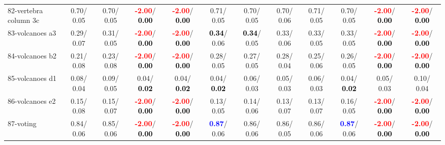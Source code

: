 \begin{table}[h]
\begin{center}
{\begin{tabular}{lc|c|c|c|c|c|c|c|c|c|c}
82-vertebra column 3c &   0.70/  0.05 &   0.70/  0.05 & \textcolor{red}{\textbf{ -2.00}}/\textcolor{black}{\textbf{  0.00}} & \textcolor{red}{\textbf{ -2.00}}/\textcolor{black}{\textbf{  0.00}} &   0.71/  0.05 &   0.70/  0.05 &   0.70/  0.06 &   0.71/  0.05 &   0.70/  0.05 & \textcolor{red}{\textbf{ -2.00}}/\textcolor{black}{\textbf{  0.00}} & \textcolor{red}{\textbf{ -2.00}}/\textcolor{black}{\textbf{  0.00}} \\
83-volcanoes a3 &   0.29/  0.07 &   0.31/  0.05 & \textcolor{red}{\textbf{ -2.00}}/\textcolor{black}{\textbf{  0.00}} & \textcolor{red}{\textbf{ -2.00}}/\textcolor{black}{\textbf{  0.00}} & \textcolor{black}{\textbf{  0.34}}/  0.06 & \textcolor{black}{\textbf{  0.34}}/  0.05 &   0.33/  0.06 &   0.33/  0.05 &   0.33/  0.05 & \textcolor{red}{\textbf{ -2.00}}/\textcolor{black}{\textbf{  0.00}} & \textcolor{red}{\textbf{ -2.00}}/\textcolor{black}{\textbf{  0.00}} \\
84-volcanoes b2 &   0.21/  0.08 &   0.23/  0.08 & \textcolor{red}{\textbf{ -2.00}}/\textcolor{black}{\textbf{  0.00}} & \textcolor{red}{\textbf{ -2.00}}/\textcolor{black}{\textbf{  0.00}} &   0.28/  0.05 &   0.27/  0.05 &   0.28/  0.04 &   0.25/  0.06 &   0.26/  0.05 & \textcolor{red}{\textbf{ -2.00}}/\textcolor{black}{\textbf{  0.00}} & \textcolor{red}{\textbf{ -2.00}}/\textcolor{black}{\textbf{  0.00}} \\
85-volcanoes d1 &   0.08/  0.04 &   0.09/  0.05 &   0.04/\textcolor{black}{\textbf{  0.02}} &   0.04/\textcolor{black}{\textbf{  0.02}} &   0.04/\textcolor{black}{\textbf{  0.02}} &   0.06/  0.03 &   0.05/  0.03 &   0.06/  0.03 &   0.04/\textcolor{black}{\textbf{  0.02}} &   0.05/  0.03 &   0.10/  0.04 \\ \hline
86-volcanoes e2 &   0.15/  0.08 &   0.15/  0.07 & \textcolor{red}{\textbf{ -2.00}}/\textcolor{black}{\textbf{  0.00}} & \textcolor{red}{\textbf{ -2.00}}/\textcolor{black}{\textbf{  0.00}} &   0.13/  0.05 &   0.14/  0.06 &   0.13/  0.07 &   0.13/  0.07 &   0.16/  0.05 & \textcolor{red}{\textbf{ -2.00}}/\textcolor{black}{\textbf{  0.00}} & \textcolor{red}{\textbf{ -2.00}}/\textcolor{black}{\textbf{  0.00}} \\
87-voting &   0.84/  0.06 &   0.85/  0.06 & \textcolor{red}{\textbf{ -2.00}}/\textcolor{black}{\textbf{  0.00}} & \textcolor{red}{\textbf{ -2.00}}/\textcolor{black}{\textbf{  0.00}} & \textcolor{blue}{\textbf{  0.87}}/  0.06 &   0.86/  0.06 &   0.86/  0.05 &   0.86/  0.06 & \textcolor{blue}{\textbf{  0.87}}/  0.06 & \textcolor{red}{\textbf{ -2.00}}/\textcolor{black}{\textbf{  0.00}} & \textcolor{red}{\textbf{ -2.00}}/\textcolor{black}{\textbf{  0.00}} \\

\end{tabular}}
\end{center}
\end{table}
